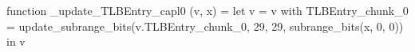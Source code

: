 function _update_TLBEntry_capl0 (v, x) = let v = { v with TLBEntry_chunk_0 = update_subrange_bits(v.TLBEntry_chunk_0, 29, 29, subrange_bits(x, 0, 0)) } in
  v

